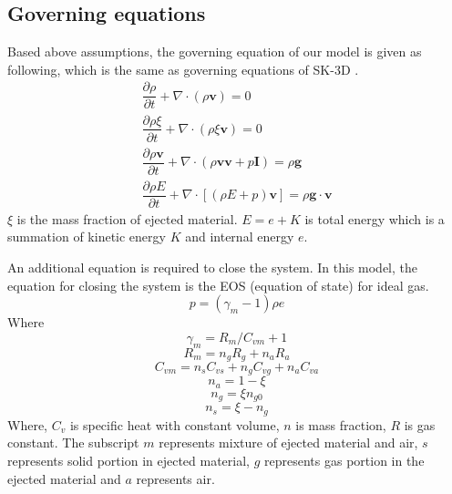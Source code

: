 \documentclass[journal abbreviation, manuscript]{copernicus}
\begin{document}
\subsection{Governing equations}
Based above assumptions, the governing equation of our model is given as following, which is the same as governing equations of SK-3D \citep{suzuki2005numerical}.
\begin{align}
\dfrac{\partial \rho}{\partial t} + \nabla \cdot (\rho \textbf{v}) = 0 \label{eq:gov-cs-rho} \\
\dfrac{\partial \rho \xi}{\partial t} + \nabla \cdot (\rho \xi \textbf{v}) = 0 \label{eq:gov-cs-ks}\\
\dfrac{\partial \rho \textbf{v}}{\partial t} + \nabla \cdot (\rho \textbf{v} \textbf{v} + p\textbf{I}) = \rho \textbf{g} \label{eq:gov-cs-v} \\
\dfrac{\partial \rho E}{\partial t} + \nabla \cdot [(\rho E + p )\textbf{v}] = \rho \textbf{g} \cdot\textbf{v} \label{eq:gov-cs-e}
\end{align}
$\xi$ is the mass fraction of ejected material.
$E = e + K $ is total energy which is a summation of kinetic energy $K$ and internal energy $e$.

An additional equation is required to close the system. In this model, the equation for closing the system is the EOS (equation of state) for ideal gas.
\begin{equation}
p = (\gamma_m - 1)\rho e \label{eq:EOS}
\end{equation}
Where 
\begin{equation}
\gamma_m = R_m/C_{vm} + 1 \label{eq:gov-gm}
\end{equation}
\begin{equation}
R_m = n_gR_g + n_aR_a  \label{eq:gov-Rm}
\end{equation}
\begin{equation}
C_{vm} = n_s C_{vs} + n_g C_{vg} + n_a C_{va} \label{eq:gov-Cvm}
\end{equation}
\begin{equation}
n_a = 1 - \xi \label{eq:gov-na}
\end{equation}
\begin{equation}
n_g = \xi n_{g0} \label{eq:gov-ng}
\end{equation}
\begin{equation}
n_s = \xi - n_g \label{eq:gov-ns}
\end{equation}
Where, $C_v$ is specific heat with constant volume, $n$ is mass fraction, $R$ is gas constant. The subscript 
$m$ represents mixture of ejected material and air, $s$ represents solid portion in ejected material, $g$ represents gas portion in the ejected material and $a$ represents air.
\end{document}
